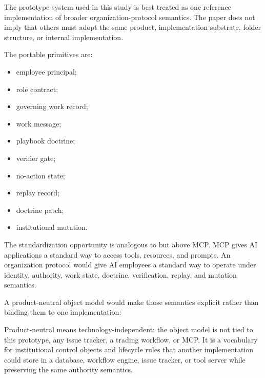 \documentclass[
]{article}
\providecommand{\tightlist}{%
  \setlength{\itemsep}{0pt}\setlength{\parskip}{0pt}}
\begin{document}
The prototype system used in this study is best treated as one reference implementation of broader organization-protocol semantics. The paper does not imply that others must adopt the same product, implementation substrate, folder structure, or internal implementation.

The portable primitives are:

\begin{itemize}
\tightlist
\item
  employee principal;
\item
  role contract;
\item
  governing work record;
\item
  work message;
\item
  playbook doctrine;
\item
  verifier gate;
\item
  no-action state;
\item
  replay record;
\item
  doctrine patch;
\item
  institutional mutation.
\end{itemize}

The standardization opportunity is analogous to but above MCP. MCP gives AI applications a standard way to access tools, resources, and prompts. An organization protocol would give AI employees a standard way to operate under identity, authority, work state, doctrine, verification, replay, and mutation semantics.

A product-neutral object model would make those semantics explicit rather than binding them to one implementation:

Product-neutral means technology-independent: the object model is not tied to this prototype, any issue tracker, a trading workflow, or MCP. It is a vocabulary for institutional control objects and lifecycle rules that another implementation could store in a database, workflow engine, issue tracker, or tool server while preserving the same authority semantics.
\end{document}
